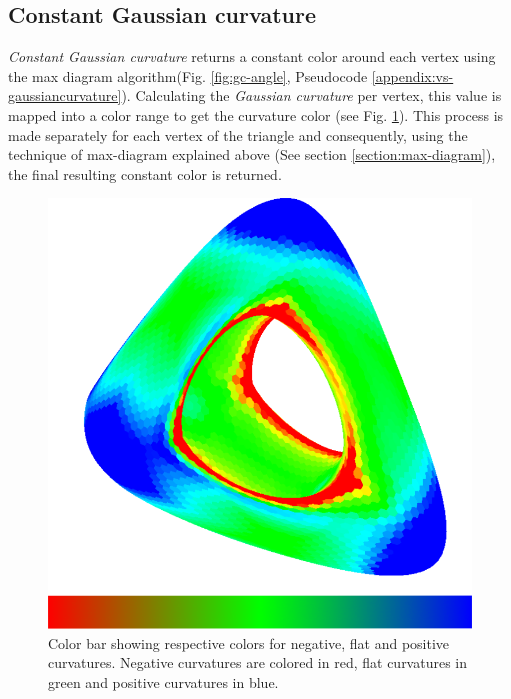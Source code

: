 
\subsection{Constant Gaussian curvature}
\textit{Constant Gaussian curvature} returns a constant color around each vertex using the max diagram algorithm(Fig. \ref{fig:gc-angle}, Pseudocode \ref{appendix:vs-gaussiancurvature}). Calculating the \textit{Gaussian curvature} per vertex, this value is mapped into a color range to get the curvature color (see Fig. \ref{fig:color-range-curvature}). This process is made separately for each vertex of the triangle and consequently, using the technique of max-diagram explained above (See section \ref{section:max-diagram}), the final resulting constant color is returned.
\begin{figure}[!h]
    \centering
    \includegraphics[scale=1.2]{images/gradient-curvature.png}
    \caption{Color bar showing respective colors for negative, flat and positive curvatures. Negative curvatures are colored in red, flat curvatures in green and positive curvatures in blue.} \label{fig:color-range-curvature}
\end{figure}


